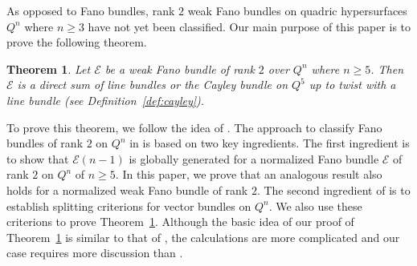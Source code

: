 \documentclass{amsproc}
\newtheorem{theorem}{Theorem}[section]
\theoremstyle{definition}
\def\cE{{\mathcal E}}
\begin{document}
As opposed to Fano bundles, rank $2$ weak Fano bundles on quadric hypersurfaces $Q^n$ where $n\ge 3$ have not yet been classified. Our main purpose of this paper is to prove the following theorem.
\begin{theorem}\label{thm:main2}
Let $\cE$ be a weak Fano bundle of rank $2$ over $Q^n$ where $n\ge 5$. Then $\cE$ is a direct sum of line bundles or the Cayley bundle on $Q^5$ up to twist with a line bundle (see Definition~\ref{def:cayley}).
\end{theorem}

To prove this theorem, we follow the idea of \cite{APW94}. The approach to classify Fano bundles of rank $2$ on $Q^n$ in \cite{APW94} is based on two key ingredients. The first ingredient is to show that $\cE(n-1)$ is globally generated for a normalized Fano bundle $\cE$ of rank $2$ on $Q^n$ of $n\ge 5$. In this paper, we prove that an analogous result also holds for a normalized weak Fano bundle of rank $2$. The second ingredient of \cite{APW94} is to establish splitting criterions for vector bundles on $Q^n$. We also use these criterions to prove Theorem~\ref{thm:main2}. Although the basic idea of our proof of Theorem~\ref{thm:main2} is similar to that of \cite{APW94}, the calculations are more complicated and our case requires more discussion than \cite{APW94}.
\end{document}
